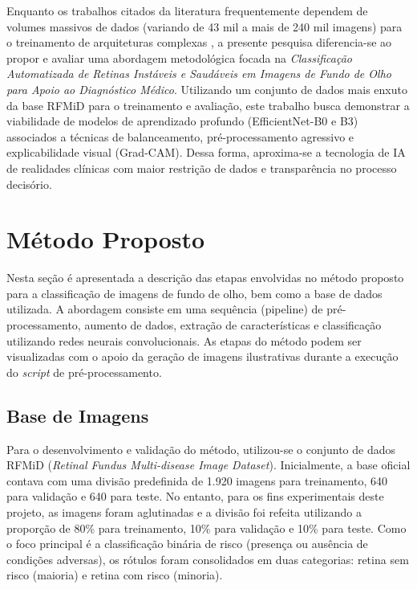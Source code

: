 \documentclass[12pt]{article}
\begin{document}
Enquanto os trabalhos citados da literatura frequentemente dependem de volumes massivos de dados (variando de 43 mil a mais de 240 mil imagens) para o treinamento de arquiteturas complexas \cite{lee:2021, cenautomatic}, a presente pesquisa diferencia-se ao propor e avaliar uma abordagem metodológica focada na \textit{Classificação Automatizada de Retinas Instáveis e Saudáveis em Imagens de Fundo de Olho para Apoio ao Diagnóstico Médico}. Utilizando um conjunto de dados mais enxuto da base RFMiD para o treinamento e avaliação, este trabalho busca demonstrar a viabilidade de modelos de aprendizado profundo (EfficientNet-B0 e B3) associados a técnicas de balanceamento, pré-processamento agressivo e explicabilidade visual (Grad-CAM). Dessa forma, aproxima-se a tecnologia de IA de realidades clínicas com maior restrição de dados e transparência no processo decisório.

\section{Método Proposto}

Nesta seção é apresentada a descrição das etapas envolvidas no método proposto para a classificação de imagens de fundo de olho, bem como a base de dados utilizada. A abordagem consiste em uma sequência (pipeline) de pré-processamento, aumento de dados, extração de características e classificação utilizando redes neurais convolucionais. As etapas do método podem ser visualizadas com o apoio da geração de imagens ilustrativas durante a execução do \textit{script} de pré-processamento.

\subsection{Base de Imagens}

Para o desenvolvimento e validação do método, utilizou-se o conjunto de dados RFMiD (\textit{Retinal Fundus Multi-disease Image Dataset}). Inicialmente, a base oficial contava com uma divisão predefinida de 1.920 imagens para treinamento, 640 para validação e 640 para teste. No entanto, para os fins experimentais deste projeto, as imagens foram aglutinadas e a divisão foi refeita utilizando a proporção de 80\% para treinamento, 10\% para validação e 10\% para teste. Como o foco principal é a classificação binária de risco (presença ou ausência de condições adversas), os rótulos foram consolidados em duas categorias: retina sem risco (maioria) e retina com risco (minoria).
\end{document}
